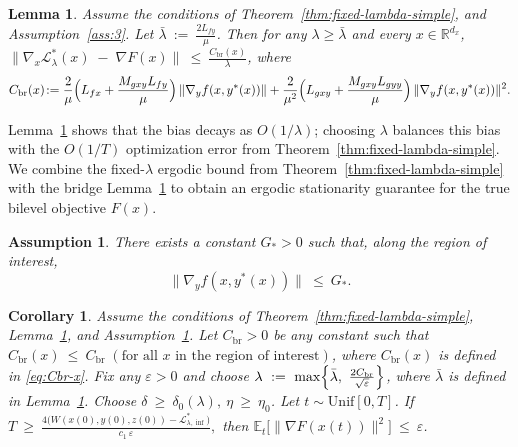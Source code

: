 \documentclass{article}
\newtheorem{lemma}[theorem]{Lemma}
\newtheorem{corollary}[theorem]{Corollary}
\newtheorem{assumption}[theorem]{Assumption}
\newcommand{\1}{\mathbf{1}}
\begin{document}
\begin{lemma}\label{lem:bridge}
Assume the conditions of Theorem~\ref{thm:fixed-lambda-simple}, and
Assumption~\ref{ass:3}. Let
$\bar\lambda\ :=\ \frac{2L_{fy}}{\mu}$. Then for any $\lambda\ge \bar\lambda$ and every $x\in\mathbb R^{d_x}$, $\bigl\|\nabla_x \mathcal L_\lambda^{*}(x)\;-\;\nabla F(x)\bigr\|
\ \le\ \frac{C_{\mathrm{br}}(x)}{\lambda}$,
where 
\begin{equation}\label{eq:Cbr-x}
\begin{aligned}
C_{\mathrm{br}}(x)\!
:=
\frac{2}{\mu}\Bigl(L_{fx}+\frac{M_{gxy}L_{fy}}{\mu}\Bigr)\,\|\nabla_y f(x,y^{*}(x))\| 
+
\frac{2}{\mu^2}\Bigl(L_{gxy}+\frac{M_{gxy}L_{gyy}}{\mu}\Bigr)\,\|\nabla_y f(x,y^{*}(x))\|^{2}.
\end{aligned}
\end{equation}
\end{lemma}
Lemma~\ref{lem:bridge} shows that the bias decays as $O(1/\lambda)$; choosing $\lambda$ balances this bias with the $O(1/T)$ optimization error from Theorem~\ref{thm:fixed-lambda-simple}.
We combine the fixed-$\lambda$ ergodic bound from Theorem~\ref{thm:fixed-lambda-simple}
with the bridge Lemma~\ref{lem:bridge} to obtain an ergodic stationarity guarantee for the true bilevel objective
$F(x)$. 
\begin{assumption}\label{ass:4}
There exists a constant $G_{*}>0$ such that, along the region of interest,
\begin{equation}\label{eq:Gstar-assump}
\|\nabla_y f(x,y^{*}(x))\|\ \le\ G_{*}.
\end{equation}
\end{assumption}
\begin{corollary}\label{cor:bilevel-eps}
Assume the conditions of Theorem~\ref{thm:fixed-lambda-simple}, Lemma~\ref{lem:bridge}, and Assumption~\ref{ass:4}. Let $C_{\mathrm{br}}>0$ be any constant such that $C_{\mathrm{br}}(x)\ \le\ C_{\mathrm{br}}
\;(\text{for all $x$ in the region of interest})$,
where $C_{\mathrm{br}}(x)$ is defined in \eqref{eq:Cbr-x}.
Fix any $\varepsilon>0$ and choose $\lambda\ :=\ \max\Bigl\{\bar\lambda,\ \frac{2C_{\mathrm{br}}}{\sqrt\varepsilon}\Bigr\}$, where $\bar\lambda$ is defined in Lemma~\ref{lem:bridge}.
Choose $\delta \ \ge\ \delta_0(\lambda), \  \eta \ \ge\ \eta_0$.
Let $t\sim\mathrm{Unif}[0,T]$. If $T\ \ge\ \frac{4\bigl(W(x(0),y(0),z(0))-\mathcal L_{\lambda,\inf}^{*}\bigr)}
{c_1\,\varepsilon},$
then $\mathbb E_t\Big[\|\nabla F(x(t))\|^{2}\Big]\ \le\ \varepsilon$.
\end{corollary}
\end{document}
